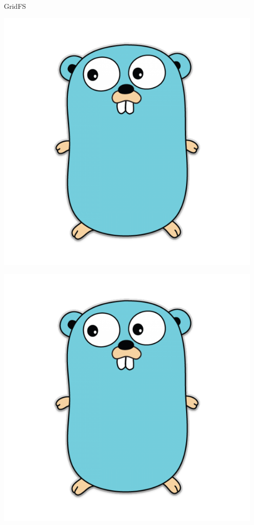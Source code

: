 \documentclass{beamer}
\begin{document}
\begin{frame}{GridFS}
\vfill
\begin{minipage}[t]{0.3\textwidth}
    \includegraphics[width=\textwidth]{golang}
\end{minipage}

\hfill
\begin{minipage}[t]{0.3\textwidth}
    \includegraphics[width=\textwidth]{golang}
\end{minipage}


\end{frame}
\end{document}
